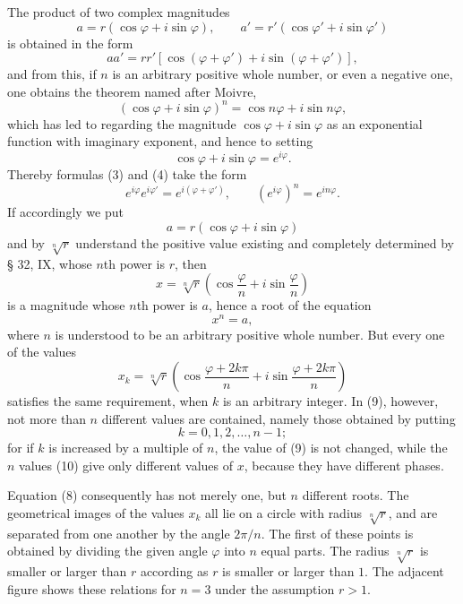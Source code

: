 \documentclass[11pt]{article}
\begin{document}
The product of two complex magnitudes
\[
 a=r(\cos\varphi+i\sin\varphi),\qquad
 a'=r'(\cos\varphi'+i\sin\varphi')
\]
is obtained in the form
\begin{equation}
 aa'=rr'[\cos(\varphi+\varphi')+i\sin(\varphi+\varphi')],
\tag{3}
\end{equation}
and from this, if $n$ is an arbitrary positive whole number, or even a negative one, one obtains the theorem named after Moivre,
\begin{equation}
 (\cos\varphi+i\sin\varphi)^n=\cos n\varphi+i\sin n\varphi,
\tag{4}
\end{equation}
which has led to regarding the magnitude $\cos\varphi+i\sin\varphi$ as an exponential function with imaginary exponent, and hence to setting
\[
 \cos\varphi+i\sin\varphi=e^{i\varphi}.
\]
Thereby formulas (3) and (4) take the form
\begin{equation}
 e^{i\varphi}e^{i\varphi'}=e^{i(\varphi+\varphi')},\qquad (e^{i\varphi})^n=e^{in\varphi}.
\tag{5}
\end{equation}
If accordingly we put
\begin{equation}
 a=r(\cos\varphi+i\sin\varphi)
\tag{6}
\end{equation}
and by $\sqrt[n]{r}$ understand the positive value existing and completely determined by § 32, IX, whose $n$th power is $r$, then
\begin{equation}
 x=\sqrt[n]{r}\left(\cos\frac{\varphi}{n}+i\sin\frac{\varphi}{n}\right)
\tag{7}
\end{equation}
is a magnitude whose $n$th power is $a$, hence a root of the equation
\begin{equation}
 x^n=a,
\tag{8}
\end{equation}
where $n$ is understood to be an arbitrary positive whole number. But every one of the values
\begin{equation}
 x_k=\sqrt[n]{r}\left(\cos\frac{\varphi+2k\pi}{n}+i\sin\frac{\varphi+2k\pi}{n}\right)
\tag{9}
\end{equation}
satisfies the same requirement, when $k$ is an arbitrary integer. In (9), however, not more than $n$ different values are contained, namely those obtained by putting
\begin{equation}
 k=0,1,2,\ldots,n-1;
\tag{10}
\end{equation}
for if $k$ is increased by a multiple of $n$, the value of (9) is not changed, while the $n$ values (10) give only different values of $x$, because they have different phases.

Equation (8) consequently has not merely one, but $n$ different roots. The geometrical images of the values $x_k$ all lie on a circle with radius $\sqrt[n]{r}$, and are separated from one another by the angle $2\pi/n$. The first of these points is obtained by dividing the given angle $\varphi$ into $n$ equal parts. The radius $\sqrt[n]{r}$ is smaller or larger than $r$ according as $r$ is smaller or larger than $1$. The adjacent figure shows these relations for $n=3$ under the assumption $r>1$.
\end{document}
